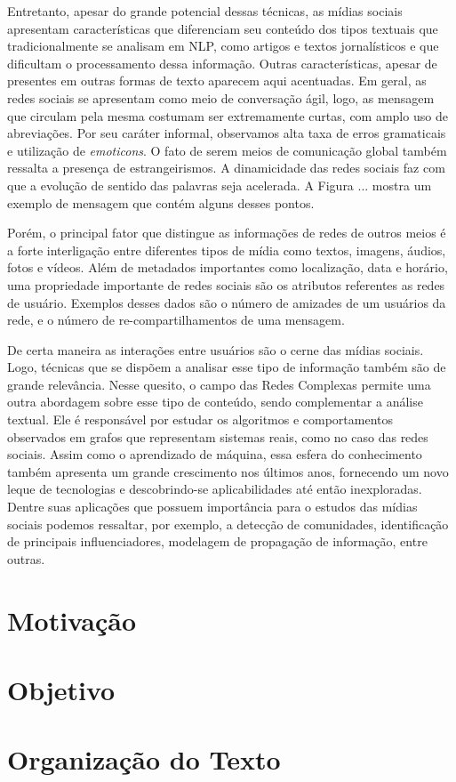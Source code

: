 Entretanto, apesar do grande potencial dessas técnicas, as mídias sociais
apresentam características que diferenciam seu conteúdo dos tipos textuais que
tradicionalmente se analisam em NLP, como artigos e textos jornalísticos e que
dificultam o processamento dessa informação.
Outras características, apesar de presentes em outras formas de texto aparecem
aqui acentuadas.
Em geral, as redes sociais se apresentam como meio de conversação ágil, logo,
as mensagem que circulam pela mesma costumam ser extremamente curtas, com amplo
uso de abreviações.
Por seu caráter informal, observamos alta taxa de erros gramaticais e utilização
de \textit{emoticons}.
O fato de serem meios de comunicação global também ressalta a presença de
estrangeirismos.
A dinamicidade das redes sociais faz com que a evolução de sentido das palavras
seja acelerada.
A Figura ... mostra um exemplo de mensagem que contém alguns desses pontos.

Porém, o principal fator que distingue as informações de redes de outros meios é
a forte interligação entre diferentes tipos de mídia como textos, imagens,
áudios, fotos e vídeos.
Além de metadados importantes como localização, data e horário, uma propriedade
importante de redes sociais são os atributos referentes as redes de usuário.
Exemplos desses dados são o número de amizades de um usuários da rede, e o
número de re-compartilhamentos de uma mensagem.

De certa maneira as interações entre usuários são o cerne das mídias sociais.
Logo, técnicas que se dispõem a analisar esse tipo de informação também são de
grande relevância.
Nesse quesito, o campo das Redes Complexas permite uma outra abordagem sobre
esse tipo de conteúdo, sendo complementar a análise textual.
Ele é responsável por estudar os algoritmos e comportamentos observados em
grafos que representam sistemas reais, como no caso das redes sociais.
Assim como o aprendizado de máquina, essa esfera do conhecimento também
apresenta um grande crescimento nos últimos anos, fornecendo um novo leque de
tecnologias e descobrindo-se aplicabilidades até então inexploradas.
Dentre suas aplicações que possuem importância para o estudos das mídias sociais
podemos ressaltar, por exemplo, a detecção de comunidades, identificação de
principais influenciadores, modelagem de propagação de informação, entre outras.

\section{Motivação}
\section{Objetivo}
\section{Organização do Texto}
